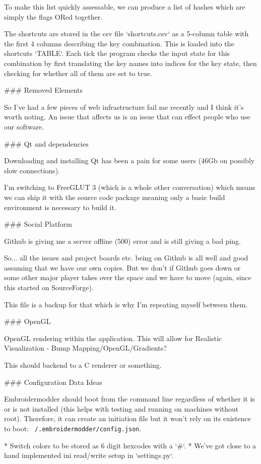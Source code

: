 To make this list quickly assessable, we can produce a list of hashes which are simply the
flags ORed together.

The shortcuts are stored in the csv file `shortcuts.csv` as a 5-column table
with the first 4 columns describing the key combination. This is loaded into
the shortcuts `TABLE`. Each tick the program checks the input state for this
combination by first translating the key names into indices for the key state,
then checking for whether all of them are set to true.

### Removed Elements

So I've had a few pieces of web infrastructure fail me recently and I think
it's worth noting. An issue that affects us is an issue that can effect people
who use our software.

### Qt and dependencies

Downloading and installing Qt has been a pain for some users (46Gb on possibly
slow connections).

I'm switching to FreeGLUT 3 (which is a whole other conversation) which means
we can ship it with the source code package meaning only a basic build
environment is necessary to build it.

### Social Platform

Github is giving me a server offline (500) error and is still giving a bad ping.

So... all the issues and project boards etc. being on Github is all well and
good assuming that we have our own copies. But we don't if Github goes down or
some other major player takes over the space and we have to move (again, since
this started on SourceForge).

This file is a backup for that which is why I'm repeating myself between them.

### OpenGL

OpenGL rendering within the application. This will allow for Realistic Visualization - Bump
Mapping/OpenGL/Gradients?

This should backend to a C renderer or something.

### Configuration Data Ideas

Embroidermodder should boot from the command line regardless of whether it is or is not
installed (this helps with testing and running on machines without root). Therefore, it can
create an initiation file but it won't rely on its existence to boot:
\texttt{~/.embroidermodder/config.json}.

* Switch colors to be stored as 6 digit hexcodes with a `\#`.
* We've got close to a hand implemented ini read/write setup in `settings.py`.

